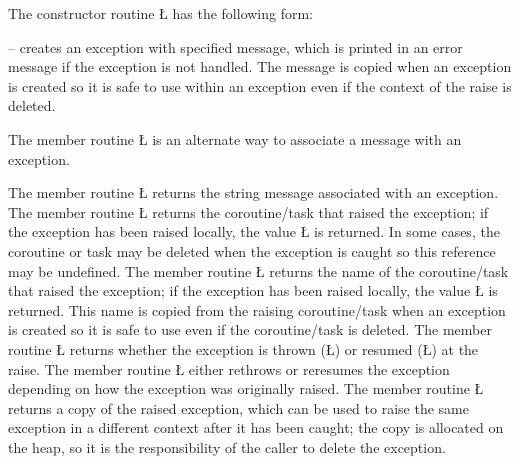\documentclass[openright,twoside]{report}
\begin{document}
The constructor routine \LGinlinetrue\LGbegin\lgrinde\L{}\endlgrinde\LGend{} has the following form:
\begin{prefix}
\item[\LGinlinetrue\LGbegin\lgrinde\L{\LB{\V{uBaseEvent}(\0\K{const}\0\K{char}\0\*\K{const}\0\V{msg}\0=\0\S{}\"\"\SE{}\0)}}\endlgrinde\LGend{}]
-- creates an exception with specified message, which is printed in an error message if the exception is not handled.
The message is copied when an exception is created so it is safe to use within an exception even if the context of the raise is deleted.
\end{prefix}
The member routine \LGinlinetrue\LGbegin\lgrinde\L{}\endlgrinde\LGend{} is an alternate way to associate a message with an exception.

The member routine \LGinlinetrue\LGbegin\lgrinde\L{}\endlgrinde\LGend{} returns the string message associated with an exception.
The member routine \LGinlinetrue\LGbegin\lgrinde\L{}\endlgrinde\LGend{} returns the coroutine/task that raised the exception;
if the exception has been raised locally, the value \LGinlinetrue\LGbegin\lgrinde\L{}\endlgrinde\LGend{} is returned.
In some cases, the coroutine or task may be deleted when the exception is caught so this reference may be undefined.
The member routine \LGinlinetrue\LGbegin\lgrinde\L{}\endlgrinde\LGend{} returns the name of the coroutine/task that raised the exception;
if the exception has been raised locally, the value \LGinlinetrue\LGbegin\lgrinde\L{}\endlgrinde\LGend{} is returned.
This name is copied from the raising coroutine/task when an exception is created so it is safe to use even if the coroutine/task is deleted.
The member routine \LGinlinetrue\LGbegin\lgrinde\L{}\endlgrinde\LGend{} returns whether the exception is thrown (\LGinlinetrue\LGbegin\lgrinde\L{}\endlgrinde\LGend{}) or resumed (\LGinlinetrue\LGbegin\lgrinde\L{}\endlgrinde\LGend{}) at the raise.
The member routine \LGinlinetrue\LGbegin\lgrinde\L{}\endlgrinde\LGend{} either rethrows or reresumes the exception depending on how the exception was originally raised.
The member routine \LGinlinetrue\LGbegin\lgrinde\L{}\endlgrinde\LGend{} returns a copy of the raised exception, which can be used to raise the same exception in a different context after it has been caught;
the copy is allocated on the heap, so it is the responsibility of the caller to delete the exception.
\end{document}
